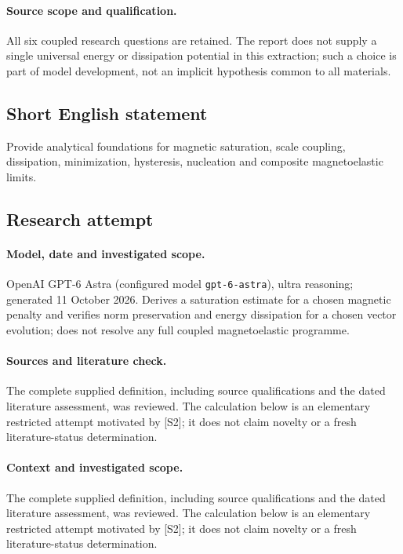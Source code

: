 \documentclass[11pt]{article}
\begin{document}
\paragraph{Source scope and qualification.}
All six coupled research questions are retained. The report does not supply a single universal energy or dissipation potential in this extraction; such a choice is part of model development, not an implicit hypothesis common to all materials.
\subsection{Short English statement}
Provide analytical foundations for magnetic saturation, scale coupling, dissipation, minimization, hysteresis, nucleation and composite magnetoelastic limits.
\subsection{Research attempt}
\paragraph{Model, date and investigated scope.}
OpenAI GPT-6 Astra (configured model \texttt{gpt-6-astra}), ultra reasoning; generated 11 October 2026. Derives a saturation estimate for a chosen magnetic penalty and verifies norm preservation and energy dissipation for a chosen vector evolution; does not resolve any full coupled magnetoelastic programme.

\paragraph{Sources and literature check.}
The complete supplied definition, including source qualifications and the dated literature assessment, was reviewed. The calculation below is an elementary restricted attempt motivated by [S2]; it does not claim novelty or a fresh literature-status determination.

\paragraph{Context and investigated scope.} The complete supplied definition, including source qualifications and the dated literature assessment, was reviewed. The calculation below is an elementary restricted attempt motivated by [S2]; it does not claim novelty or a fresh literature-status determination.
\end{document}
